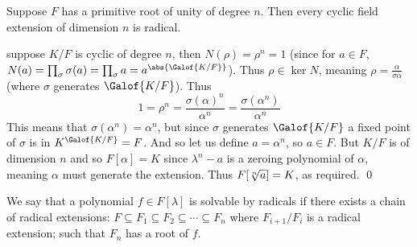 \bthrm[title=Kummer's Theorem, name=kummer]

    Suppose $F$ has a primitive root of unity of degree $n$.
    Then every cyclic field extension of dimension $n$ is radical.

\ethrm

\Proof suppose $K/F$ is cyclic of degree $n$, then $N(\rho)=\rho^n=1$ (since for $a\in F$, $N(a)=\prod_\sigma \sigma(a)=\prod_\sigma a=a^{\abs{\Galof{K/F}}}$).
Thus $\rho\in\ker N$, meaning $\rho=\frac\alpha{\sigma\alpha}$ (where $\sigma$ generates $\Galof{K/F}$).
Thus
$$ 1 = \rho^n = \frac{\sigma(\alpha)^n}{\alpha^n} = \frac{\sigma(\alpha^n)}{\alpha^n} $$
This means that $\sigma(\alpha^n)=\alpha^n$, but since $\sigma$ generates $\Galof{K/F}$ a fixed point of $\sigma$ is in $K^{\Galof{K/F}}=F$.
And so let us define $a=\alpha^n$, so $a\in F$.
But $K/F$ is of dimension $n$ and so $F[\alpha]=K$ since $\lambda^n-a$ is a zeroing polynomial of $\alpha$, meaning $\alpha$ must generate the extension.
Thus $F[\root n\of a]=K$, as required.
\qed

\bdefn

    We say that a polynomial $f\in F[\lambda]$ is {\emphcolor solvable by radicals} if there exists a chain of radical extensions: $F\subseteq F_1\subseteq F_2\subseteq\cdots\subseteq F_n$ where
    $F_{i+1}/F_i$ is a radical extension; such that $F_n$ has a root of $f$.

\edefn

\bye

